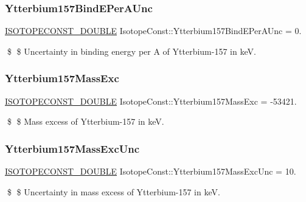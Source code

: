 \subsubsection{\texorpdfstring{Ytterbium157\+Bind\+E\+Per\+A\+Unc}{Ytterbium157BindEPerAUnc}}
{\footnotesize\ttfamily \mbox{\hyperlink{group___isotope_const-_macros_ga8f45a7272ce02c0b4c65c44636ed719a}{I\+S\+O\+T\+O\+P\+E\+C\+O\+N\+S\+T\+\_\+\+D\+O\+U\+B\+LE}} Isotope\+Const\+::\+Ytterbium157\+Bind\+E\+Per\+A\+Unc = 0.}

\$ \$ Uncertainty in binding energy per A of Ytterbium-\/157 in keV. \mbox{\label{group___isotope_const-_ytterbium-_yb157_gae28623e6601f98c30a8a1ec109935962}} 
\subsubsection{\texorpdfstring{Ytterbium157\+Mass\+Exc}{Ytterbium157MassExc}}
{\footnotesize\ttfamily \mbox{\hyperlink{group___isotope_const-_macros_ga8f45a7272ce02c0b4c65c44636ed719a}{I\+S\+O\+T\+O\+P\+E\+C\+O\+N\+S\+T\+\_\+\+D\+O\+U\+B\+LE}} Isotope\+Const\+::\+Ytterbium157\+Mass\+Exc = -\/53421.}

\$ \$ Mass excess of Ytterbium-\/157 in keV. \mbox{\label{group___isotope_const-_ytterbium-_yb157_ga549d19d935f7a63835fb110dc9fd4c05}} 
\subsubsection{\texorpdfstring{Ytterbium157\+Mass\+Exc\+Unc}{Ytterbium157MassExcUnc}}
{\footnotesize\ttfamily \mbox{\hyperlink{group___isotope_const-_macros_ga8f45a7272ce02c0b4c65c44636ed719a}{I\+S\+O\+T\+O\+P\+E\+C\+O\+N\+S\+T\+\_\+\+D\+O\+U\+B\+LE}} Isotope\+Const\+::\+Ytterbium157\+Mass\+Exc\+Unc = 10.}

\$ \$ Uncertainty in mass excess of Ytterbium-\/157 in keV. \mbox{\label{group___isotope_const-_ytterbium-_yb157_ga8e973675168eff402c9f123e35505033}} 
